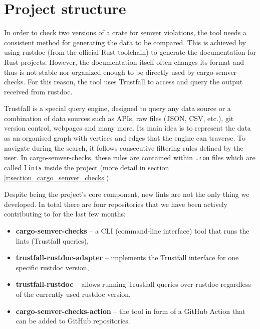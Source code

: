 \documentclass[licencjacka,en]{pracamgr}
\begin{document}
\section{Project structure}\label{r:section_project_structure}

In order to check two versions of a crate for semver violations, the tool needs a consistent method
for generating the data to be compared. This is achieved by using rustdoc (from the official
Rust toolchain) to generate the documentation for Rust projects. However, the documentation itself
often changes its format and thus is not stable nor organized enough to be directly used by
cargo-semver-checks. For this reason, the tool uses Trustfall to access and query the output
received from rustdoc.

Trustfall is a special query engine, designed to query any data source or a combination of data
sources such as APIs, raw files (JSON, CSV, etc.), git version control, webpages and many more.
Its main idea is to represent the data as an organised graph with vertices and edges that the
engine can traverse. To navigate during the search, it follows consecutive filtering rules defined
by the user. In cargo-semver-checks, these rules are contained within \texttt{.ron} files which
are called \texttt{lints} inside the project (more detail in section
\ref{r:section_cargo_semver_checks}).

Despite being the project's core component, new lints are not the only thing we developed. In total
there are four repositories that we have been actively contributing to for the last few months:
\begin{itemize}
	\item \textbf{cargo-semver-checks} -- a CLI (command-line interface) tool that runs the lints
		(Trustfall queries),
	\item \textbf{trustfall-rustdoc-adapter} -- implements the Trustfall interface for one specific
		rustdoc version,
	\item \textbf{trustfall-rustdoc} -- allows running Trustfall queries over rustdoc regardless of
		the currently used rustdoc version,
	\item \textbf{cargo-semver-checks-action} -- the tool in form of a GitHub Action that can
	    be added to GitHub repositories.
\end{itemize}
\end{document}
